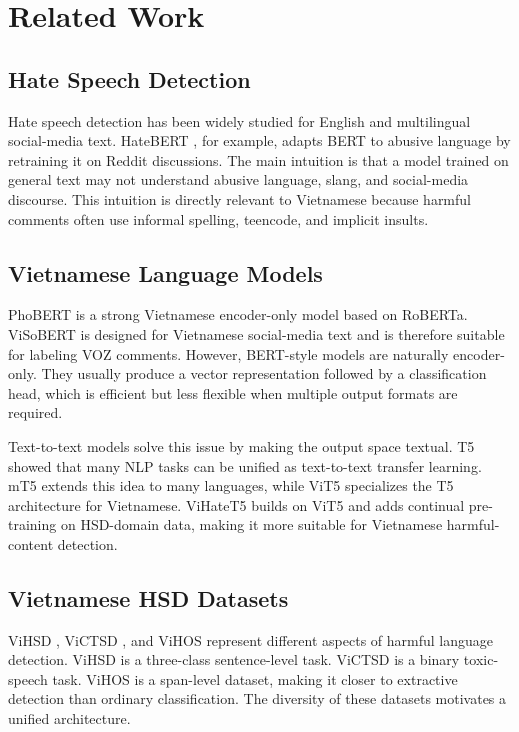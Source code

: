 \documentclass[journal]{IEEEtran}
\begin{document}
\section{Related Work}
\subsection{Hate Speech Detection}
Hate speech detection has been widely studied for English and multilingual social-media text. HateBERT \cite{hatebert}, for example, adapts BERT to abusive language by retraining it on Reddit discussions. The main intuition is that a model trained on general text may not understand abusive language, slang, and social-media discourse. This intuition is directly relevant to Vietnamese because harmful comments often use informal spelling, teencode, and implicit insults.

\subsection{Vietnamese Language Models}
PhoBERT \cite{phobert} is a strong Vietnamese encoder-only model based on RoBERTa. ViSoBERT \cite{visobert} is designed for Vietnamese social-media text and is therefore suitable for labeling VOZ comments. However, BERT-style models are naturally encoder-only. They usually produce a vector representation followed by a classification head, which is efficient but less flexible when multiple output formats are required.

Text-to-text models solve this issue by making the output space textual. T5 \cite{t5} showed that many NLP tasks can be unified as text-to-text transfer learning. mT5 \cite{mt5} extends this idea to many languages, while ViT5 \cite{vit5} specializes the T5 architecture for Vietnamese. ViHateT5 builds on ViT5 and adds continual pre-training on HSD-domain data, making it more suitable for Vietnamese harmful-content detection.

\subsection{Vietnamese HSD Datasets}
ViHSD \cite{vihsd}, ViCTSD \cite{victsd}, and ViHOS \cite{vihos} represent different aspects of harmful language detection. ViHSD is a three-class sentence-level task. ViCTSD is a binary toxic-speech task. ViHOS is a span-level dataset, making it closer to extractive detection than ordinary classification. The diversity of these datasets motivates a unified architecture.
\end{document}
